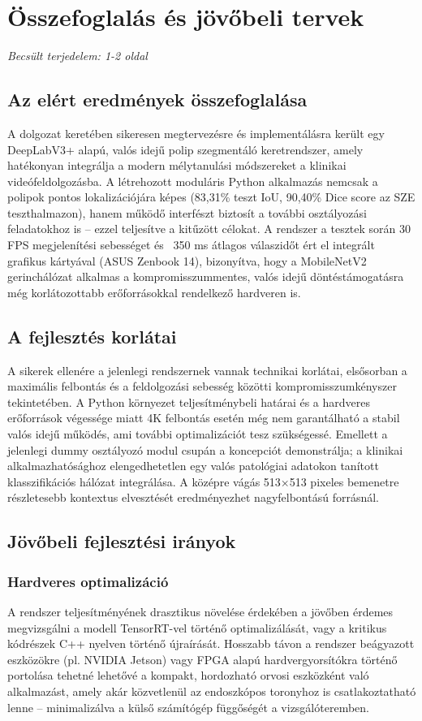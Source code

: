 \documentclass[12pt, a4paper]{report}
\begin{document}
\chapter{Összefoglalás és jövőbeli tervek}
\textit{Becsült terjedelem: 1-2 oldal}

\section{Az elért eredmények összefoglalása}
A dolgozat keretében sikeresen megtervezésre és implementálásra került egy DeepLabV3+ alapú, valós idejű polip szegmentáló keretrendszer, amely hatékonyan integrálja a modern mélytanulási módszereket a klinikai videófeldolgozásba. A létrehozott moduláris Python alkalmazás nemcsak a polipok pontos lokalizációjára képes (83,31\% teszt IoU, 90,40\% Dice score az SZE teszthalmazon), hanem működő interfészt biztosít a további osztályozási feladatokhoz is – ezzel teljesítve a kitűzött célokat. A rendszer a tesztek során 30 FPS megjelenítési sebességet és ~350 ms átlagos válaszidőt ért el integrált grafikus kártyával (ASUS Zenbook 14), bizonyítva, hogy a MobileNetV2 gerinchálózat alkalmas a kompromisszummentes, valós idejű döntéstámogatásra még korlátozottabb erőforrásokkal rendelkező hardveren is.

\section{A fejlesztés korlátai}
A sikerek ellenére a jelenlegi rendszernek vannak technikai korlátai, elsősorban a maximális felbontás és a feldolgozási sebesség közötti kompromisszumkényszer tekintetében. A Python környezet teljesítménybeli határai és a hardveres erőforrások végessége miatt 4K felbontás esetén még nem garantálható a stabil valós idejű működés, ami további optimalizációt tesz szükségessé. Emellett a jelenlegi dummy osztályozó modul csupán a koncepciót demonstrálja; a klinikai alkalmazhatósághoz elengedhetetlen egy valós patológiai adatokon tanított klasszifikációs hálózat integrálása. A középre vágás 513×513 pixeles bemenetre részletesebb kontextus elvesztését eredményezhet nagyfelbontású forrásnál.

\section{Jövőbeli fejlesztési irányok}

\subsection{Hardveres optimalizáció}
A rendszer teljesítményének drasztikus növelése érdekében a jövőben érdemes megvizsgálni a modell TensorRT-vel történő optimalizálását, vagy a kritikus kódrészek C++ nyelven történő újraírását. Hosszabb távon a rendszer beágyazott eszközökre (pl. NVIDIA Jetson) vagy FPGA alapú hardvergyorsítókra történő portolása tehetné lehetővé a kompakt, hordozható orvosi eszközként való alkalmazást, amely akár közvetlenül az endoszkópos toronyhoz is csatlakoztatható lenne – minimalizálva a külső számítógép függőségét a vizsgálóteremben.
\end{document}
